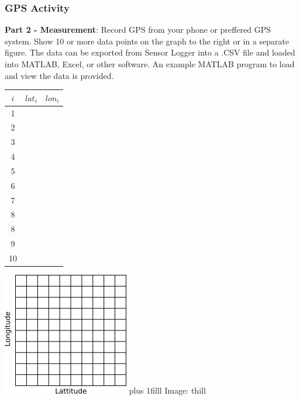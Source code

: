 \documentclass[fleqn]{beamer} %
\newcommand{\sectionIsubsectionIVtitle}{GPS Activity}
\newcommand{\btVFill}{\vskip0pt plus 1filll}
\begin{document}
			\begin{frame}
				\frametitle{\sectionIsubsectionIVtitle}

				\scriptsize
				{\bf Part 2 - Measurement}: Record GPS from your phone or preffered GPS system. Show 10 or more data points on the graph to the right or in a separate figure. The data can be exported from Sensor Logger into a .CSV file and loaded into MATLAB, Excel, or other software. An example MATLAB program to load and view the data is provided.   \\
				
				\begin{multicols}{2}

					\setlength{\tabcolsep}{20pt}
					\renewcommand{\arraystretch}{1.0}
					\begin{tabular}{|c|c|c|} \hline
					$i$ & $lat_i$ & $lon_i$ \\\hline
					  1  & &              \\ \hline
					  2  & &              \\ \hline
					  3  & &              \\ \hline
					  4  & &              \\ \hline
					  5  & &              \\ \hline
					  6  & &              \\ \hline
					  7  & &              \\ \hline
					  8  & &              \\ \hline
					  8  & &              \\ \hline		
					  9  & &              \\ \hline
		             10  & &              \\ \hline
					\end{tabular}

					\includegraphics[scale=0.8]{images/lat_lon_grid.png}
					\btVFill
					{\tiny Image: thill}
				\end{multicols}	
				
			\end{frame}
	
\end{document}
